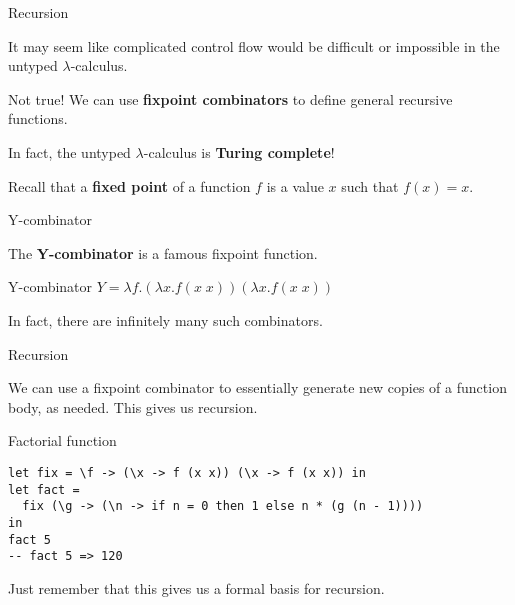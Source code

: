 %
\begin{frame}{Recursion}

It may seem like complicated control flow would be difficult or impossible in
the untyped $\lambda$-calculus.

Not true! We can use \textbf{fixpoint combinators} to define general recursive
functions. 

In fact, the untyped $\lambda$-calculus is \textbf{Turing complete}!

Recall that a \textbf{fixed point} of a function $f$ is a value $x$ such that
$f(x) = x$.

\end{frame}

%
\begin{frame}{Y-combinator}

The \textbf{Y-combinator} is a famous fixpoint function.

\begin{block}{Y-combinator}
$Y = \lambda f.(\lambda x.f (x \; x)) (\lambda x.f (x \; x))$
\end{block}

In fact, there are infinitely many such combinators.

\end{frame}

%
\begin{frame}[fragile]{Recursion}

We can use a fixpoint combinator to essentially generate new copies of a
function body, as needed. This gives us recursion.

\begin{block}{Factorial function}
\begin{verbatim}
let fix = \f -> (\x -> f (x x)) (\x -> f (x x)) in 
let fact = 
  fix (\g -> (\n -> if n = 0 then 1 else n * (g (n - 1)))) 
in
fact 5
-- fact 5 => 120
\end{verbatim}
\end{block}

Just remember that this gives us a formal basis for recursion.

\end{frame}
